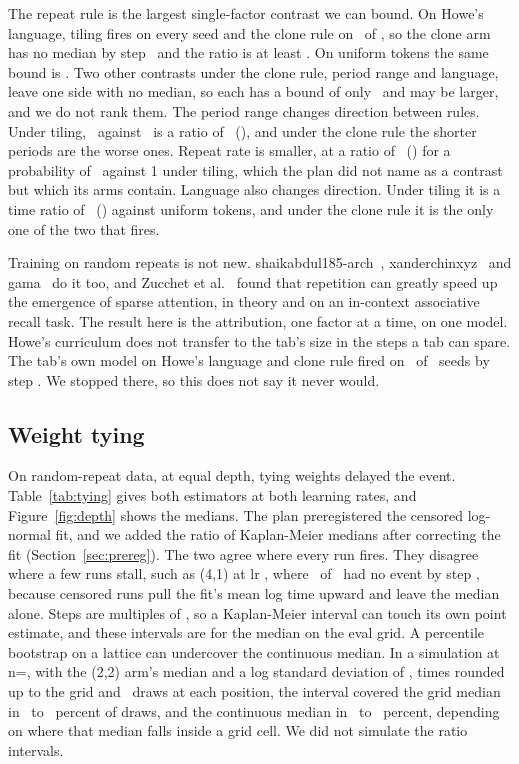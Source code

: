 \documentclass[10pt]{article}
\newcommand{\arm}[2]{(#1,#2)}
\let\periodsLong\nRangeLong
\renewcommand{\nRangeLong}{\mbox{\periodsLong}}
\let\periodsShort\nRangeShort
\renewcommand{\nRangeShort}{\mbox{\periodsShort}}
\begin{document}
The repeat rule is the largest single-factor contrast we can bound. On Howe's language, tiling fires on every seed and the clone rule on \nRuleBiCloneEv\ of \nRuleBiCloneN, so the clone arm has no median by step \nCrossedBudget\ and the ratio is at least \nRuleBiBound. On uniform tokens the same bound is \nRuleUniBound. Two other contrasts under the clone rule, period range and language, leave one side with no median, so each has a bound of only \nCloneWeakBound\ and may be larger, and we do not rank them. The period range changes direction between rules. Under tiling, \nRangeLong\ against \nRangeShort\ is a ratio of \nRangeUniRatio\ (\nRangeUniCi), and under the clone rule the shorter periods are the worse ones. Repeat rate is smaller, at a ratio of \nRateRatio\ (\nRateCi) for a probability of \nPRepLow\ against 1 under tiling, which the plan did not name as a contrast but which its arms contain. Language also changes direction. Under tiling it is a time ratio of \nLanguageFit\ (\nLanguageFitCi) against uniform tokens, and under the clone rule it is the only one of the two that fires.

Training on random repeats is not new. shaikabdul185-arch~\cite{shaik}, xanderchinxyz~\cite{xander} and gama~\cite{gama} do it too, and Zucchet et al.~\cite{zucchet} found that repetition can greatly speed up the emergence of sparse attention, in theory and on an in-context associative recall task. The result here is the attribution, one factor at a time, on one model. Howe's curriculum does not transfer to the tab's size in the steps a tab can spare. The tab's own model on Howe's language and clone rule fired on \nTabHoweEv\ of \nTabHoweN\ seeds by step \nTabHoweBudget. We stopped there, so this does not say it never would.

\subsection{Weight tying}

On random-repeat data, at equal depth, tying weights delayed the event. Table~\ref{tab:tying} gives both estimators at both learning rates, and Figure~\ref{fig:depth} shows the medians. The plan preregistered the censored log-normal fit, and we added the ratio of Kaplan-Meier medians after correcting the fit (Section~\ref{sec:prereg}). The two agree where every run fires. They disagree where a few runs stall, such as \arm{4}{1} at lr \nLrHi, where \nCensorFourOne\ of \nNFourOneHi\ had no event by step \nBudgetFourOneHi, because censored runs pull the fit's mean log time upward and leave the median alone. Steps are multiples of \nEvalEvery, so a Kaplan-Meier interval can touch its own point estimate, and these intervals are for the median on the eval grid. A percentile bootstrap on a lattice can undercover the continuous median. In a simulation at n=\nLatticeN, with the \arm{2}{2} arm's median and a log standard deviation of \nLatticeSd, times rounded up to the grid and \nLatticeReps\ draws at each position, the interval covered the grid median in \nLatticeGridLow\ to \nLatticeGridHigh\ percent of draws, and the continuous median in \nLatticeContinuousLow\ to \nLatticeContinuousHigh\ percent, depending on where that median falls inside a grid cell. We did not simulate the ratio intervals.
\end{document}
